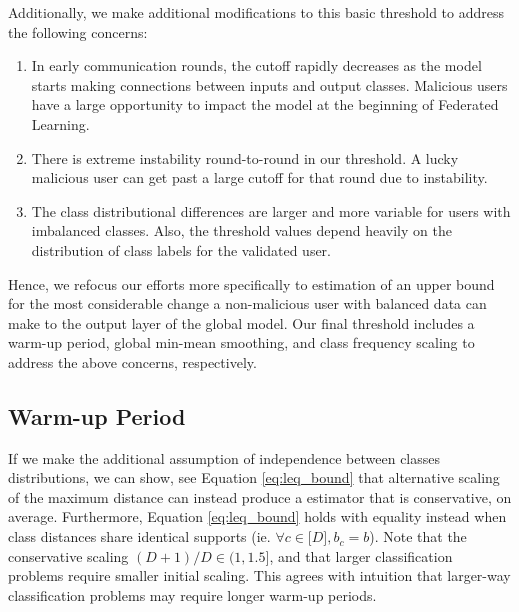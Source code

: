 \documentclass{article} %
\begin{document}
Additionally, we make additional modifications to this basic threshold to address the following concerns:
\begin{enumerate}
    \item In early communication rounds, the cutoff rapidly decreases as the model starts making connections between inputs and output classes. Malicious users have a large opportunity to impact the model at the beginning of Federated Learning.
    \item There is extreme instability round-to-round in our threshold. A lucky malicious user can get past a large cutoff for that round due to instability.
    \item The class distributional differences are larger and more variable for users with imbalanced classes. Also, the threshold values depend heavily on the distribution of class labels for the validated user.
\end{enumerate}

Hence, we refocus our efforts more specifically to estimation of an upper bound for the most considerable change a non-malicious user with balanced data can make to the output layer of the global model. Our final threshold includes a warm-up period, global min-mean smoothing, and class frequency scaling to address the above concerns, respectively.

%
\subsection{Warm-up Period}

If we make the additional assumption of independence between classes distributions, we can show, see Equation \ref{eq:leq_bound} that alternative scaling of the maximum distance can instead produce a estimator that is conservative, on average. Furthermore, Equation \ref{eq:leq_bound} holds with equality instead when class distances share identical supports (ie. $\forall c \in \mathopen[ D \mathclose], b_c = b$). Note that the conservative scaling $(D + 1) / D \in \mathopen(1, \mathclose 1.5]$, and that larger classification problems require smaller initial scaling. This agrees with intuition that larger-way classification problems may require longer warm-up periods. 
\end{document}
